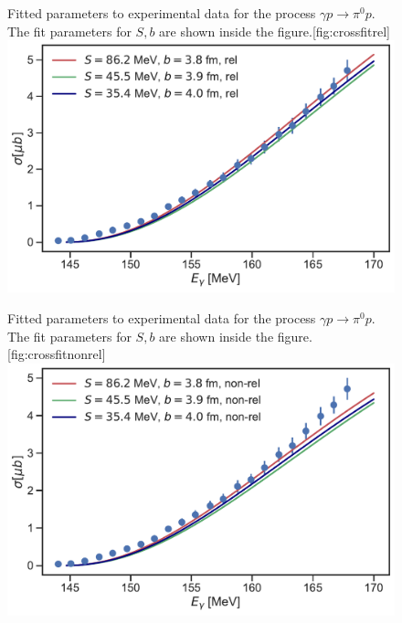 \begin{figure}[H]
    \begin{sidecaption}{Fitted parameters to experimental data for the process $\gamma p \rightarrow \pi^0 p$. The fit parameters for $S,b$ are shown inside the figure.}[fig:crossfitrel]
    \includegraphics[width=\linewidth]{Figures/crossfit_rel.pdf}
    \end{sidecaption}
\end{figure}

\begin{figure}[H]
	\begin{sidecaption}{Fitted parameters to experimental data for the process $\gamma p \rightarrow \pi^0 p$. The fit parameters for $S,b$ are shown inside the figure.}[fig:crossfitnonrel]
		\includegraphics[width=\linewidth]{Figures/crossfit_nonrel.pdf}
	\end{sidecaption}
\end{figure}



